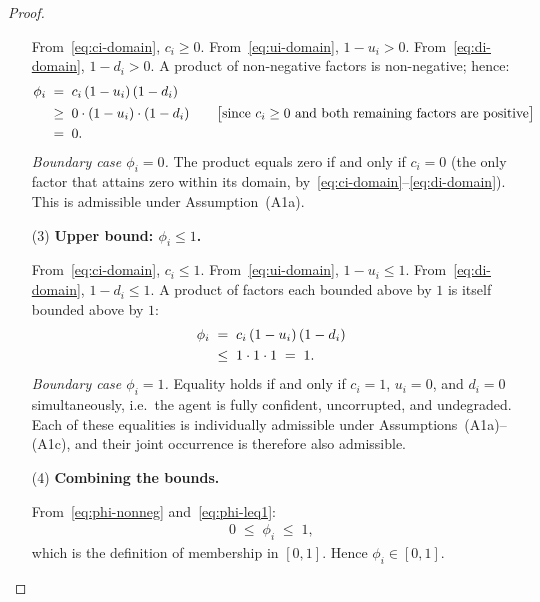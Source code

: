 \documentclass[12pt,openany]{book}
\numberwithin{equation}{chapter}
\theoremstyle{plain}
\theoremstyle{definition}
\theoremstyle{remark}
\numberwithin{equation}{chapter}
\theoremstyle{plain}
\begin{document}
\begin{proof}
\begin{enumerate}
        From~\eqref{eq:ci-domain}, $c_i \geq 0$.
        From~\eqref{eq:ui-domain}, $1 - u_i > 0$.
        From~\eqref{eq:di-domain}, $1 - d_i > 0$.
        A product of non-negative factors is non-negative;
        hence:
        \begin{align}
          \phi_i
          &\;=\; c_i\,(1 - u_i)\,(1 - d_i) \notag \\
          &\;\geq\; 0 \cdot (1 - u_i) \cdot (1 - d_i)
            \qquad
            \bigl[\text{since } c_i \geq 0
            \text{ and both remaining factors are positive}\bigr]
            \notag \\
          &\;=\; 0.
          \label{eq:phi-nonneg}
        \end{align}
        \textit{Boundary case $\phi_i = 0$.}
        The product equals zero if and only if $c_i = 0$
        (the only factor that attains zero within its domain,
        by~\eqref{eq:ci-domain}--\eqref{eq:di-domain}).
        This is admissible under Assumption~\textup{(A1a)}.

  \item[\textup{(3)}] \textbf{Upper bound: $\phi_i \leq 1$.}

        From~\eqref{eq:ci-domain}, $c_i \leq 1$.
        From~\eqref{eq:ui-domain}, $1 - u_i \leq 1$.
        From~\eqref{eq:di-domain}, $1 - d_i \leq 1$.
        A product of factors each bounded above by $1$ is
        itself bounded above by $1$:
        \begin{align}
          \phi_i
          &\;=\; c_i\,(1 - u_i)\,(1 - d_i) \notag \\
          &\;\leq\; 1 \cdot 1 \cdot 1
          \;=\; 1.
          \label{eq:phi-leq1}
        \end{align}
        \textit{Boundary case $\phi_i = 1$.}
        Equality holds if and only if $c_i = 1$,
        $u_i = 0$, and $d_i = 0$ simultaneously, i.e.\
        the agent is fully confident, uncorrupted, and
        undegraded.  Each of these equalities is
        individually admissible under
        Assumptions~\textup{(A1a)}--\textup{(A1c)},
        and their joint occurrence is therefore also
        admissible.

  \item[\textup{(4)}] \textbf{Combining the bounds.}

        From~\eqref{eq:phi-nonneg} and~\eqref{eq:phi-leq1}:
        \begin{align}
          0 \;\leq\; \phi_i \;\leq\; 1,
          \label{eq:phi-combined}
        \end{align}
        which is the definition of membership in $[0,1]$.
        Hence $\phi_i \in [0,1]$.


\end{enumerate}
\end{proof}
\end{document}
